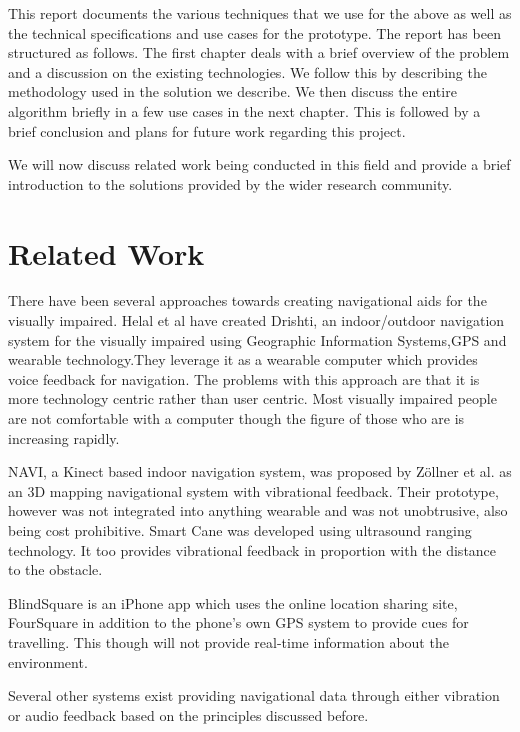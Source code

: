 \documentclass[11pt]{report}
\begin{document}
This report documents the various techniques that we use for the above as well as the technical specifications and use cases for the prototype. The report has been structured as follows. The first chapter deals with a brief overview of the problem and a discussion on the existing technologies. We follow this by describing the methodology used in the solution we describe. We then discuss the entire algorithm briefly in a few use cases in the next chapter. This is followed by a brief conclusion and plans for future work regarding this project. 

We will now discuss related work being conducted in this field and provide a brief introduction to the solutions provided by the wider research community.



\section{Related Work}

There have been several approaches towards creating navigational aids for the visually impaired. Helal et al\cite{helal2001drishti,ran2004drishti} have created Drishti, an indoor/outdoor navigation system for the visually impaired using Geographic Information Systems,GPS and wearable technology.They leverage it as a wearable computer which provides voice feedback for navigation. The problems with this approach are that it is more technology centric rather than user centric. Most visually impaired people are not comfortable with a computer though the figure of those who are is increasing rapidly. 

NAVI, a Kinect based indoor navigation system\cite{Zollner20118609458}, was proposed by Z\"{o}llner et al. as an 3D mapping navigational system with vibrational feedback. Their prototype, however was not integrated into anything wearable and was not unobtrusive, also being cost prohibitive. Smart Cane \cite{sakhardande2012smart} was developed using ultrasound ranging technology. It too provides vibrational feedback in proportion with the distance to the obstacle.

BlindSquare\cite{blindsquare} is an iPhone app which uses the online location sharing site, FourSquare in addition to the phone's own GPS system to provide cues for travelling. This though will not provide real-time information about the environment.      

Several other systems exist providing navigational data through either vibration or audio feedback based on the principles discussed before. 
\end{document}
